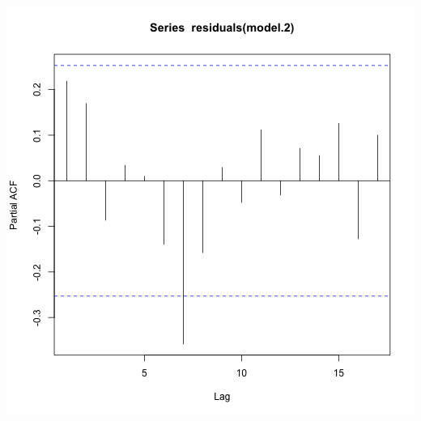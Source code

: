 \documentclass{beamer}
\begin{document}
\begin{frame}[fragile]{}
\begin{columns}
\begin{column}{0.5\textwidth}
            \includegraphics[width=\textwidth]{lectures/day_4_GLS/figures/unnamed-chunk-41-1.png}
        \end{column}
    \end{columns}
\end{frame}
\end{document}
